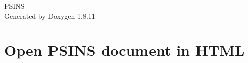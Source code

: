 \documentclass[twoside]{book}
\newcommand{\+}{\discretionary{\mbox{\scriptsize$\hookleftarrow$}}{}{}}
\newcommand{\clearemptydoublepage}{%
  \newpage{\pagestyle{empty}\cleardoublepage}%
}
\begin{document}
\hypersetup{pageanchor=false,
             bookmarksnumbered=true,
             pdfencoding=unicode
            }
\begin{titlepage}
\vspace*{7cm}
\begin{center}%
{\Large P\+S\+I\+NS }\\
\vspace*{1cm}
{\large Generated by Doxygen 1.8.11}\\
\end{center}
\end{titlepage}
\clearemptydoublepage
\tableofcontents
\clearemptydoublepage
{}
\hypersetup{pageanchor=true}

\chapter{Open P\+S\+I\+NS document in H\+T\+ML}
\label{md__home_sz_psins_PSINS-Develop-Group_Source_README}
\hypertarget{md__home_sz_psins_PSINS-Develop-Group_Source_README}{}


\backmatter
\newpage
{}
\clearemptydoublepage
{}
\printindex
\end{document}
